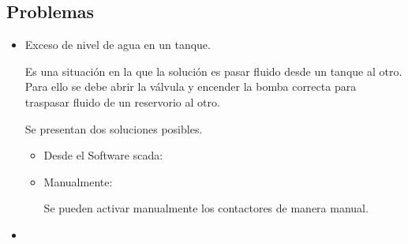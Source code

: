  \subsection{Problemas}
 
 \begin{itemize}
  \item Exceso de nivel de agua en un tanque.
  
  Es una situación en la que la solución es pasar fluido desde
  un tanque al otro. Para ello se debe abrir la válvula y encender la bomba
  correcta para traspasar fluido de un reservorio al otro.
  
  Se presentan dos soluciones posibles.
  
  \begin{itemize}
   \item Desde el Software \gls{scada}:
 
   \item Manualmente:
   
   Se pueden activar manualmente los contactores de manera manual.
 
 \end{itemize}

  \item 
  
 \end{itemize}
